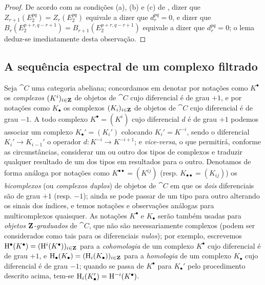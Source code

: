\begin{proof}
De acordo com as condições (a), (b) e (c) de , dizer que $Z_{r+1}(E_2^{pq})=Z_r(E_2^{pq})$ equivale a dizer que $d_r^{pq}=0$, e dizer que $B_r(E_2^{p+r,q-r+1})=B_{r+1}(E_2^{p+r,q-r+1})$ equivale a dizer que $d_r^{pq}=0$; o lema deduz-se imediatamente desta observação.
\end{proof}

\subsection{A sequência espectral de um complexo filtrado}
\label{subsection:0.11.2}

\begin{env}[11.2.1]
\label{0.11.2.1}
Seja $\cat{C}$ uma categoria abeliana; concordamos em denotar por notações como $K^\bullet$ os \emph{complexos $(K^i)_{i\in\mathbf{Z}}$} de objetos de $\cat{C}$ cujo diferencial é de grau $+1$, e por notações como $K_\bullet$ os complexos $(K_i)_{i\in\mathbf{Z}}$ de objetos de $\cat{C}$ cujo diferencial é de grau $-1$.
A todo complexo $K^\bullet=(K^i)$ cujo diferencial $d$ é de grau $+1$ podemos associar um complexo $K_\bullet'=(K_i')$ colocando $K_i'=K^{-i}$, sendo o diferencial $K_i'\to K_{i-1}'$ o operador $d:K^{-i}\to K^{-i+1}$; e \emph{vice-versa}, o que permitirá, conforme as circunstâncias, considerar um ou outro dos tipos de complexos e traduzir qualquer resultado de um dos tipos em resultados para o outro.
Denotamos de forma análoga por notações como $K^{\bullet\bullet}=(K^{ij})$ (resp. $K_{\bullet\bullet}=(K_{ij})$) os \emph{bicomplexos} (ou \emph{complexos duplos}) de objetos de $\cat{C}$ em que os \emph{dois} diferenciais são de grau $+1$ (resp. $-1$); ainda se pode passar de um tipo para outro alterando os sinais dos índices, e temos notações e observações análogas para multicomplexos quaisquer.
As notações $K^\bullet$ e $K_\bullet$ serão também usadas para \emph{objetos $\mathbf{Z}$-graduados} de $\cat{C}$, que não são necessariamente complexos (podem ser considerados como tais para os diferenciais \emph{nulos}); por exemplo, escrevemos $\mathrm{H}^\bullet(K^\bullet)=(\mathrm{H}^i(K^\bullet))_{i\in\mathbf{Z}}$ para a \emph{cohomologia} de um complexo $K^\bullet$ cujo diferencial é de grau $+1$, e $\mathrm{H}_\bullet(K_\bullet)=(\mathrm{H}_i(K_\bullet))_{i\in\mathbf{Z}}$ para a \emph{homologia} de um complexo $K_\bullet$ cujo diferencial é de grau $-1$; quando se passa de $K^\bullet$ para $K_\bullet'$ pelo procedimento descrito acima, tem-se $\mathrm{H}_i(K_\bullet')=\mathrm{H}^{-i}(K^\bullet)$.


\end{env}
